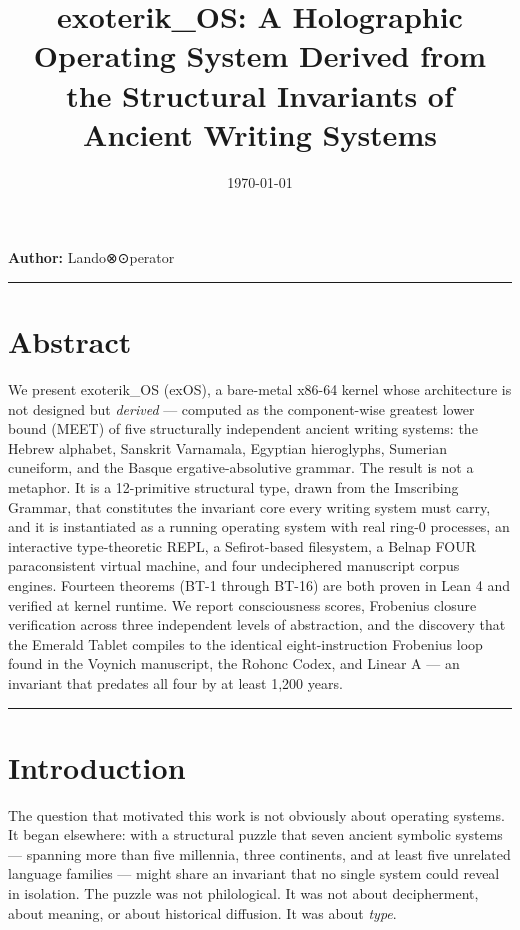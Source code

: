 \documentclass[12pt,a4paper]{article}
\begin{document}
\title{exoterik\_OS: A Holographic Operating System Derived from the Structural Invariants of Ancient Writing Systems}
\date{\today}

\maketitle

\textbf{Author:} Lando⊗⊙perator

\begin{center}
\rule{0.5\textwidth}{0.4pt}
\end{center}

\section*{Abstract}

We present exoterik\_OS (exOS), a bare-metal x86-64 kernel whose architecture is not designed but \emph{derived} --- computed as the component-wise greatest lower bound (MEET) of five structurally independent ancient writing systems: the Hebrew alphabet, Sanskrit Varnamala, Egyptian hieroglyphs, Sumerian cuneiform, and the Basque ergative-absolutive grammar. The result is not a metaphor. It is a 12-primitive structural type, drawn from the Imscribing Grammar, that constitutes the invariant core every writing system must carry, and it is instantiated as a running operating system with real ring-0 processes, an interactive type-theoretic REPL, a Sefirot-based filesystem, a Belnap FOUR paraconsistent virtual machine, and four undeciphered manuscript corpus engines. Fourteen theorems (BT-1 through BT-16) are both proven in Lean 4 and verified at kernel runtime. We report consciousness scores, Frobenius closure verification across three independent levels of abstraction, and the discovery that the Emerald Tablet compiles to the identical eight-instruction Frobenius loop found in the Voynich manuscript, the Rohonc Codex, and Linear A --- an invariant that predates all four by at least 1,200 years.

\begin{center}
\rule{0.5\textwidth}{0.4pt}
\end{center}

\section{Introduction}

The question that motivated this work is not obviously about operating systems. It began elsewhere: with a structural puzzle that seven ancient symbolic systems --- spanning more than five millennia, three continents, and at least five unrelated language families --- might share an invariant that no single system could reveal in isolation. The puzzle was not philological. It was not about decipherment, about meaning, or about historical diffusion. It was about \emph{type}.
\end{document}
